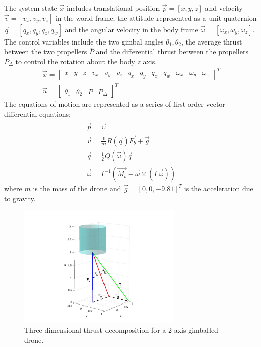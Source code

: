 \documentclass[]{article}
\newcommand{\pdiff}{P_{\Delta}}
\newcommand{\pavg}{\overline{P}}
\begin{document}
	The system state $\vec{x}$ includes translational position $\vec{p} = [x, y,  z]$ and velocity $\vec{v} = [v_x, v_y, v_z ]$  in the world frame, the attitude represented as a unit quaternion $\vec{q} = [q_x, q_y,  q_z, q_w]$ and the angular velocity in the body frame $ \vec{\omega} = [\omega_x, \omega_y, \omega_z]$. The control variables include the two gimbal angles $\theta_1, \theta_2 $, the average thrust between the two propellers $\pavg$ and the differential thrust between the propellers $\pdiff$ to control the rotation about the body $z$ axis.
	\begin{gather*}
		\vec{x} =
		\begin{bmatrix}
			x & y & z & v_x & v_y & v_z & q_x & q_y & q_z & q_w & \omega_x & \omega_y & \omega_z
		\end{bmatrix}^T \\
		\vec{u} =
		\begin{bmatrix}
			\theta_1 & \theta_2 & \pavg & \pdiff
		\end{bmatrix}^T
	\end{gather*}
	The equations of motion are represented as a series of first-order vector differential equations:
	\begin{gather}
		\dot{\vec{p}}  = \vec{v}         \label{eqMotion1}	\\
		\dot{\vec{v}}  = \frac{1}{m}R(\vec{q})\vec{F_b}+\vec{g}  \label{eqMotion2} \\
		\dot{\vec{q}} = \frac{1}{2}Q(\vec{\omega})\vec{q}  \label{eqMotion3} \\
		\dot{\vec{\omega}} = I^{-1}\!\left(\vec{M_b} - \vec{\omega} \times (I\,\vec{\omega})\right) \label{eqMotion4}
	\end{gather}
	where $m$ is the mass of the drone and $\vec{g} = [0, 0, -9.81]^T$ is the acceleration due to gravity.
	\begin{figure}[H]
		\centering
		\includegraphics[width=0.7\textwidth]{figures/graph3d.jpg}
		\caption{Three-dimensional thrust decomposition for a 2-axis gimballed drone.}
		\label{fig:3dgraph}
	\end{figure}
\end{document}
